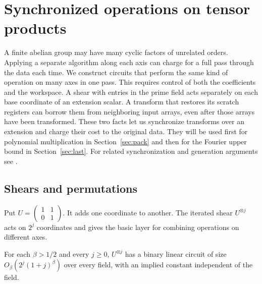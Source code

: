 \section{Synchronized operations on tensor products}\label{sec:lay}

A finite abelian group may have many cyclic factors of unrelated orders.
Applying a separate algorithm along each axis can charge for a full pass
through the data each time. We construct circuits that perform the same
kind of operation on many axes in one pass. This requires control of
both the coefficients and the workspace. A shear with entries in the
prime field acts separately on each base coordinate of an extension
scalar. A transform that restores its scratch registers can borrow them
from neighboring input arrays, even after those arrays have been
transformed. These two facts let us synchronize transforms over an
extension and charge their cost to the original data. They will be used
first for polynomial multiplication in Section~\ref{sec:pack} and then
for the Fourier upper bound in Section~\ref{sec:last}. For related
synchronization and generation arguments see
\cite[Sections~2--3]{FiniteFourier}.

\subsection{Shears and permutations}

Put \(U=\left(\begin{smallmatrix}1&1\\0&1\end{smallmatrix}\right)\).
It adds one coordinate to another. The iterated shear \(U^{\otimes j}\)
acts on \(2^j\) coordinates and gives the basic layer for combining
operations on different axes.

\begin{lemma}\label{lem:shear}
For each \(\beta>1/2\) and every \(j\ge0\), \(U^{\otimes j}\) has a
binary linear circuit of size \(O_\beta(2^j(1+j)^\beta)\) over every
field, with an implied constant independent of the field.
\end{lemma}

